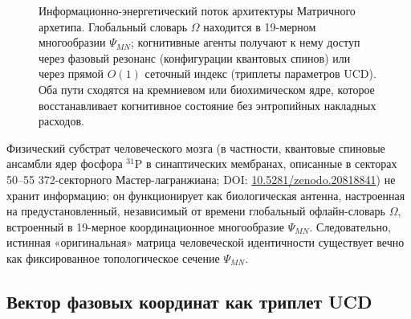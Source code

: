 \documentclass[12pt,a4paper]{article}
\begin{document}
	\begin{figure}[h!]
		\centering
		\caption{Информационно-энергетический поток архитектуры Матричного архетипа. Глобальный словарь \(\Omega\) находится в 19-мерном многообразии \(\Psi_{MN}\); когнитивные агенты получают к нему доступ через фазовый резонанс (конфигурации квантовых спинов) или через прямой \(O(1)\) сеточный индекс (триплеты параметров UCD). Оба пути сходятся на кремниевом или биохимическом ядре, которое восстанавливает когнитивное состояние без энтропийных накладных расходов.}
		\label{fig:matrix_flow}
	\end{figure}
	
	Физический субстрат человеческого мозга (в частности, квантовые спиновые ансамбли ядер фосфора \(^{31}\)P в синаптических мембранах, описанные в секторах 50--55 372-секторного Мастер-лагранжиана; DOI: \href{https://doi.org/10.5281/zenodo.20818841}{10.5281/zenodo.20818841}) не хранит информацию; он функционирует как биологическая антенна, настроенная на предустановленный, независимый от времени глобальный офлайн-словарь \(\Omega\), встроенный в 19-мерное координационное многообразие \(\Psi_{MN}\). Следовательно, истинная «оригинальная» матрица человеческой идентичности существует вечно как фиксированное топологическое сечение \(\Psi_{MN}\).
	
	\subsection{Вектор фазовых координат как триплет UCD}
	
\end{document}
